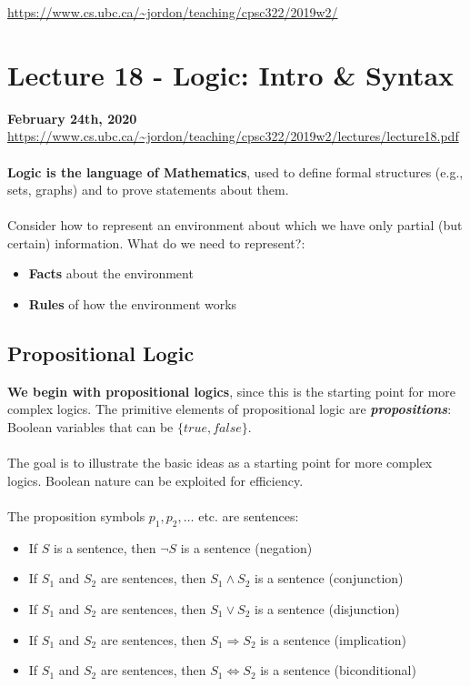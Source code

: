 \documentclass{article}
\def\blu#1{{\color{blu}#1}}
\begin{document}
\noindent \url{https://www.cs.ubc.ca/~jordon/teaching/cpsc322/2019w2/}
\section*{Lecture 18 - Logic: Intro \& Syntax}
\textbf{February 24th, 2020}\\
\url{https://www.cs.ubc.ca/~jordon/teaching/cpsc322/2019w2/lectures/lecture18.pdf}\\
\\
\textbf{Logic is the language of Mathematics}, used to define formal structures (e.g., sets, graphs) and to prove statements about them.\\
\\
Consider how to represent an environment about which we have only partial (but certain) information. What do we need to represent?:
\begin{itemize}
	\item \textbf{\blu{Facts}} about the environment
\item \textbf{{\color{Fuchsia}Rules}} of how the environment works
\end{itemize}
\subsection*{Propositional Logic}
\textbf{We begin with propositional logics}, since this is the starting point for more complex logics. The primitive elements of propositional logic are \textbf{\textit{propositions}}: Boolean variables that can be  $ \{true, false\} $.\\
\\
The goal is to illustrate the basic ideas as a starting point for more complex logics. Boolean nature can be exploited for efficiency.\\
\\
The proposition symbols $ p_1, p_2, \dots $ etc. are sentences:
\begin{itemize}
	\item If $ S $ is a sentence, then $ \lnot S $ is a sentence (\blu{negation})
	\item If $ S_1 $ and $ S_2 $ are sentences, then $ S_1 \land S_2 $ is a sentence (\blu{conjunction})
	\item If $ S_1 $ and $ S_2 $ are sentences, then $ S_1 \lor S_2 $ is a sentence (\blu{disjunction})
	\item If $ S_1 $ and $ S_2 $ are sentences, then $ S_1 \Rightarrow S_2 $ is a sentence (\blu{implication})
	\item If $ S_1 $ and $ S_2 $ are sentences, then $ S_1 \Leftrightarrow S_2 $ is a sentence (\blu{biconditional})
\end{itemize}
\end{document}

